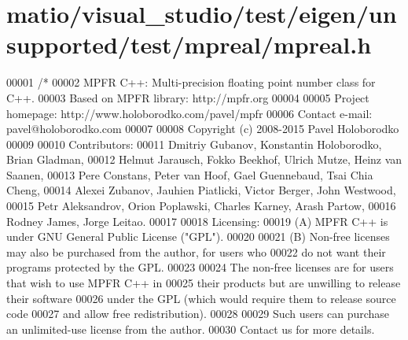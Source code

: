 \hypertarget{matio_2visual__studio_2test_2eigen_2unsupported_2test_2mpreal_2mpreal_8h_source}{}\section{matio/visual\+\_\+studio/test/eigen/unsupported/test/mpreal/mpreal.h}
\label{matio_2visual__studio_2test_2eigen_2unsupported_2test_2mpreal_2mpreal_8h_source}

\begin{DoxyCode}
00001 \textcolor{comment}{/*}
00002 \textcolor{comment}{    MPFR C++: Multi-precision floating point number class for C++.}
00003 \textcolor{comment}{    Based on MPFR library:    http://mpfr.org}
00004 \textcolor{comment}{}
00005 \textcolor{comment}{    Project homepage:    http://www.holoborodko.com/pavel/mpfr}
00006 \textcolor{comment}{    Contact e-mail:      pavel@holoborodko.com}
00007 \textcolor{comment}{}
00008 \textcolor{comment}{    Copyright (c) 2008-2015 Pavel Holoborodko}
00009 \textcolor{comment}{}
00010 \textcolor{comment}{    Contributors:}
00011 \textcolor{comment}{    Dmitriy Gubanov, Konstantin Holoborodko, Brian Gladman,}
00012 \textcolor{comment}{    Helmut Jarausch, Fokko Beekhof, Ulrich Mutze, Heinz van Saanen,}
00013 \textcolor{comment}{    Pere Constans, Peter van Hoof, Gael Guennebaud, Tsai Chia Cheng,}
00014 \textcolor{comment}{    Alexei Zubanov, Jauhien Piatlicki, Victor Berger, John Westwood,}
00015 \textcolor{comment}{    Petr Aleksandrov, Orion Poplawski, Charles Karney, Arash Partow,}
00016 \textcolor{comment}{    Rodney James, Jorge Leitao.}
00017 \textcolor{comment}{}
00018 \textcolor{comment}{    Licensing:}
00019 \textcolor{comment}{    (A) MPFR C++ is under GNU General Public License ("GPL").}
00020 \textcolor{comment}{}
00021 \textcolor{comment}{    (B) Non-free licenses may also be purchased from the author, for users who}
00022 \textcolor{comment}{        do not want their programs protected by the GPL.}
00023 \textcolor{comment}{}
00024 \textcolor{comment}{        The non-free licenses are for users that wish to use MPFR C++ in}
00025 \textcolor{comment}{        their products but are unwilling to release their software}
00026 \textcolor{comment}{        under the GPL (which would require them to release source code}
00027 \textcolor{comment}{        and allow free redistribution).}
00028 \textcolor{comment}{}
00029 \textcolor{comment}{        Such users can purchase an unlimited-use license from the author.}
00030 \textcolor{comment}{        Contact us for more details.}

\end{DoxyCode}
